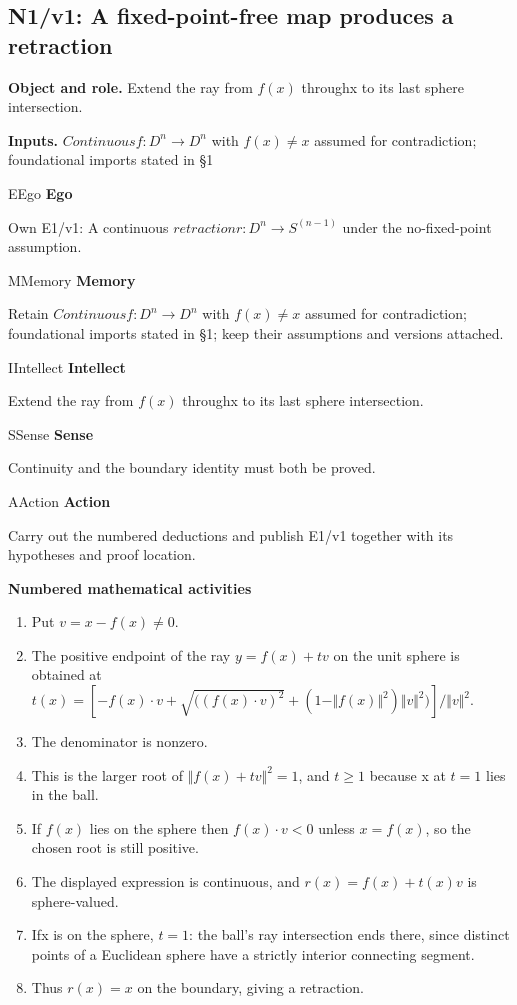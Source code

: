 \documentclass[preprint,12pt,aps,pra,showkeys,amsmath,amssymb,superscriptaddress,floatfix]{revtex4-2}
\theoremstyle{definition}
\theoremstyle{remark}
\newcommand{\mmfaculty}[3]{%
 \begin{mmfacultybox}{#1}{#2}
 {\sffamily\bfseries\color{MMBlue}#2}\par\smallskip #3
 \end{mmfacultybox}}
\newcommand{\field}[2]{\par\smallskip\noindent\textbf{#1.} #2\par}
\begin{document}
\subsection{N1/v1: A fixed-point-free map produces a retraction}

\field{Object and role}{Extend the ray from \(f(x)\) throughx to its last sphere intersection.}

\field{Inputs}{\(Continuousf:D^{n}\to D^{n}\) with \(f(x)\ne x\) assumed for
contradiction; foundational imports stated in §1}

\mmfaculty{E}{Ego}{Own E1/v1: A continuous \(retractionr:D^{n}\to S^{(n-1)}\) under the
no-fixed-point assumption.}

\mmfaculty{M}{Memory}{Retain \(Continuousf:D^{n}\to D^{n}\) with \(f(x)\ne x\) assumed for
contradiction; foundational imports stated in §1; keep their assumptions
and versions attached.}

\mmfaculty{I}{Intellect}{Extend the ray from \(f(x)\) throughx to its last sphere intersection.}

\mmfaculty{S}{Sense}{Continuity and the boundary identity must both be proved.}

\mmfaculty{A}{Action}{Carry out the numbered deductions and publish E1/v1 together with its
hypotheses and proof location.}

\smallskip\noindent\textbf{Numbered mathematical activities}

\begin{enumerate}[label=N1.\arabic*,leftmargin=3.4em]

\item Put \(v=x-f(x)\ne 0\).

\item The positive endpoint of the ray \(y=f(x)+tv\) on the unit sphere is
obtained at
\(t(x)=[-f(x)\cdot v+\sqrt{((f(x)\cdot v)^{2}}+(1-\Vert f(x)\Vert ^{2})\Vert v\Vert ^{2})]/\Vert v\Vert ^{2}\).

\item The denominator is nonzero.

\item This is the larger root of \(\Vert f(x)+tv\Vert ^{2}=1\), and \(t\ge 1\)
because x at \(t=1\) lies in the ball.

\item If \(f(x)\) lies on the sphere then \(f(x)\cdot v<0\) unless \(x=f(x)\),
so the chosen root is still positive.

\item The displayed expression is continuous, and \(r(x)=f(x)+t(x)v\) is
sphere-valued.

\item Ifx is on the sphere, \(t=1\): the ball's ray intersection ends there,
since distinct points of a Euclidean sphere have a strictly interior
connecting segment.

\item Thus \(r(x)=x\) on the boundary, giving a retraction.

\end{enumerate}
\end{document}

